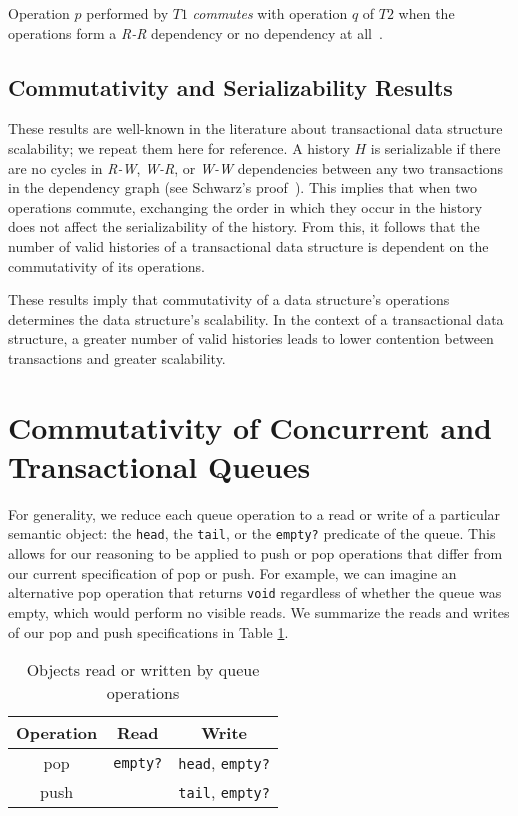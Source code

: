 \begin{defn}
    Operation $p$ performed by $T1$ \emph{commutes} with operation $q$ of $T2$ when the operations form a \emph{R-R} dependency or no dependency at all~\cite{weihl}.
\end{defn}

\subsection{Commutativity and Serializability Results}

These results are well-known in the literature about transactional data structure scalability; we repeat them here for reference.
A history $H$ is serializable if there are no cycles in \emph{R-W}, \emph{W-R}, or \emph{W-W} dependencies between any two transactions in the dependency graph (see Schwarz's proof~\cite{schwarz}). This implies that when two operations commute, exchanging the order in which they occur in the history does not affect the serializability of the history. From this, it follows that the number of valid histories of a transactional data structure is dependent on the commutativity of its operations.

These results imply that commutativity of a data structure's operations determines the data structure's scalability. In the context of a transactional data structure, a greater number of valid histories leads to lower contention between transactions and greater scalability. 

\section{Commutativity of Concurrent and Transactional Queues}

For generality, we reduce each queue operation to a read or write of a particular semantic object: the \texttt{head}, the \texttt{tail}, or the \texttt{empty?} predicate of the queue. This allows for our reasoning to be applied to push or pop operations that differ from our current specification of pop or push. For example, we can imagine an alternative pop operation that returns \texttt{void} regardless of whether the queue was empty, which would perform no visible reads. We summarize the reads and writes of our pop and push specifications in Table \ref{table:qrw}.

\begin{table}[t]
\centering
\begin{tabular}{c||c|c}
    Operation & Read & Write\\
    \hline
    pop & \texttt{empty?} & \texttt{head}, \texttt{empty?}\\
    push & & \texttt{tail}, \texttt{empty?}\\
\end{tabular}
    \caption{Objects read or written by queue operations}
    \label{table:qrw}
\end{table}

